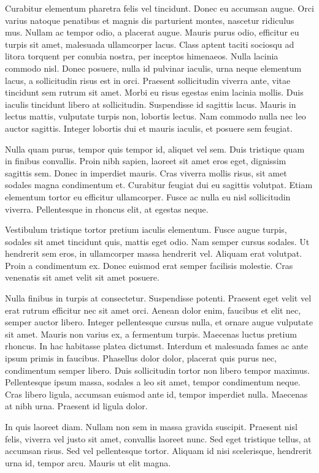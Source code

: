 Curabitur elementum pharetra felis vel tincidunt. Donec eu accumsan augue. Orci varius natoque penatibus et magnis dis parturient montes, nascetur ridiculus mus. Nullam ac tempor odio, a placerat augue. Mauris purus odio, efficitur eu turpis sit amet, malesuada ullamcorper lacus. Class aptent taciti sociosqu ad litora torquent per conubia nostra, per inceptos himenaeos. Nulla lacinia commodo nisl. Donec posuere, nulla id pulvinar iaculis, urna neque elementum lacus, a sollicitudin risus est in orci. Praesent sollicitudin viverra ante, vitae tincidunt sem rutrum sit amet. Morbi eu risus egestas enim lacinia mollis. Duis iaculis tincidunt libero at sollicitudin. Suspendisse id sagittis lacus. Mauris in lectus mattis, vulputate turpis non, lobortis lectus. Nam commodo nulla nec leo auctor sagittis. Integer lobortis dui et mauris iaculis, et posuere sem feugiat.

Nulla quam purus, tempor quis tempor id, aliquet vel sem. Duis tristique quam in finibus convallis. Proin nibh sapien, laoreet sit amet eros eget, dignissim sagittis sem. Donec in imperdiet mauris. Cras viverra mollis risus, sit amet sodales magna condimentum et. Curabitur feugiat dui eu sagittis volutpat. Etiam elementum tortor eu efficitur ullamcorper. Fusce ac nulla eu nisl sollicitudin viverra. Pellentesque in rhoncus elit, at egestas neque.

Vestibulum tristique tortor pretium iaculis elementum. Fusce augue turpis, sodales sit amet tincidunt quis, mattis eget odio. Nam semper cursus sodales. Ut hendrerit sem eros, in ullamcorper massa hendrerit vel. Aliquam erat volutpat. Proin a condimentum ex. Donec euismod erat semper facilisis molestie. Cras venenatis sit amet velit sit amet posuere.

Nulla finibus in turpis at consectetur. Suspendisse potenti. Praesent eget velit vel erat rutrum efficitur nec sit amet orci. Aenean dolor enim, faucibus et elit nec, semper auctor libero. Integer pellentesque cursus nulla, et ornare augue vulputate sit amet. Mauris non varius ex, a fermentum turpis. Maecenas luctus pretium rhoncus. In hac habitasse platea dictumst. Interdum et malesuada fames ac ante ipsum primis in faucibus. Phasellus dolor dolor, placerat quis purus nec, condimentum semper libero. Duis sollicitudin tortor non libero tempor maximus. Pellentesque ipsum massa, sodales a leo sit amet, tempor condimentum neque. Cras libero ligula, accumsan euismod ante id, tempor imperdiet nulla. Maecenas at nibh urna. Praesent id ligula dolor.

In quis laoreet diam. Nullam non sem in massa gravida suscipit. Praesent nisl felis, viverra vel justo sit amet, convallis laoreet nunc. Sed eget tristique tellus, at accumsan risus. Sed vel pellentesque tortor. Aliquam id nisi scelerisque, hendrerit urna id, tempor arcu. Mauris ut elit magna.


